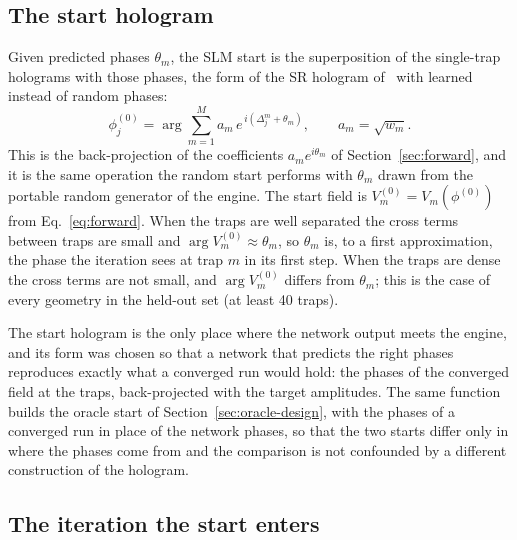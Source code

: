 \subsection{The start hologram}\label{sec:start}

Given predicted phases $\theta_m$, the SLM start is the superposition of the single-trap holograms with those phases, the form of the SR hologram of~\cite{dileonardo} with learned instead of random phases:
\begin{equation}
\phi^{(0)}_j=\arg\sum_{m=1}^{M}a_m\,e^{\,i(\Delta_j^m+\theta_m)},\qquad a_m=\sqrt{w_m}.
\label{eq:start}
\end{equation}
This is the back-projection of the coefficients $a_me^{i\theta_m}$ of Section~\ref{sec:forward}, and it is the same operation the random start performs with $\theta_m$ drawn from the portable random generator of the engine. The start field is $V^{(0)}_m=V_m(\phi^{(0)})$ from Eq.~\eqref{eq:forward}. When the traps are well separated
the cross terms between traps are small and $\arg V^{(0)}_m\approx\theta_m$, so $\theta_m$ is, to a first approximation, the phase the iteration sees at trap $m$ in its first step. When the traps are dense the cross terms are not small, and $\arg V^{(0)}_m$ differs from $\theta_m$; this is the case of every geometry in the held-out set (at least 40 traps).

The start hologram is the only place where the network output meets the engine, and its form was chosen so that a network that predicts the right phases reproduces exactly what a converged run would hold: the phases of the converged field at the traps, back-projected with the target amplitudes. The same function builds the oracle start of Section~\ref{sec:oracle-design}, with the phases of a converged run in place of the network phases, so that the two starts differ only in where the phases come from and the comparison is not confounded by a different construction of the hologram.

\subsection{The iteration the start enters}\label{sec:m07}

